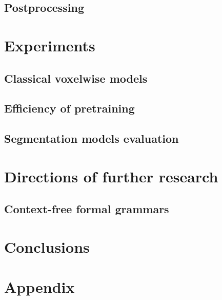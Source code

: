 \documentclass[twocolumn, a4paper]{article}
\theoremstyle{definition}
\begin{document}
\subsection{Postprocessing}

\section{Experiments}

\subsection{Classical voxelwise models} \label{sec:voxelwise_expr}

\subsection{Efficiency of pretraining}

\subsection{Segmentation models evaluation}

\section{Directions of further research}
\subsection{Context-free formal grammars}

\section{Conclusions}




\onecolumn
\section*{Appendix}
\end{document}

